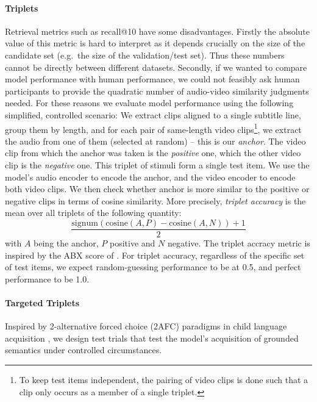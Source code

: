 \paragraph{Triplets}
Retrieval metrics such as recall@10 have some disadvantages. Firstly
the absolute value of this metric is hard to interpret as it depends
crucially on the size of the candidate set (e.g.\ the size of the
validation/test set). Thus these numbers cannot be directly between
different datasets. Secondly, if we wanted to compare model
performance with human performance, we could not feasibly ask human
participants to provide the quadratic number of audio-video similarity
judgments needed. For these reasons we evaluate model performance
using the following simplified, controlled scenario: We extract clips
aligned to a single subtitle line, group them by length, and for each
pair of same-length video clips\footnote{To keep test items
  independent, the pairing of video clips is done such that a clip
  only occurs as a member of a single triplet.}, we extract the audio
from one of them (selected at random) -- this is our {\it anchor}. The
video clip from which the anchor was taken is the {\it positive} one,
which the other video clip is the {\it negative} one. This triplet of
stimuli form a single test item.  We use the model's audio encoder to
encode the anchor, and the video encoder to encode both video
clips. We then check whether anchor is more similar to the positive or
negative clips in terms of cosine similarity.  More precisely, {\it
  triplet accuracy} is the mean over all triplets of the following
quantity:
\begin{equation}
  \frac{\mathrm{signum}(\mathrm{cosine}(A, P) - \mathrm{cosine}(A, N)) + 1}{2}
  \label{eq:triplet-acc}
\end{equation}
with $A$ being the anchor, $P$ positive and $N$ negative. The triplet
accracy metric is inspired by the ABX score of \citet{schatz2016abx}.
For triplet accuracy, regardless of the specific set of test items, we
expect random-guessing performance to be at 0.5, and perfect
performance to be 1.0.

\paragraph{Targeted Triplets}
Inspired by 2-alternative forced choice (2AFC) paradigms in child language acquisition \citep{noble2011comprehension, bergelson20126}, we design test trials that test the model's acquisition of grounded semantics under controlled circumstances.


